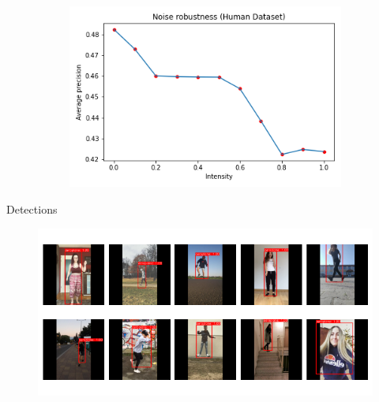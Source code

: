 \documentclass[en]{sdqbeamer}
\begin{document}
\begin{frame}
\begin{figure}
\begin{subfigure}{0.45\textwidth}
    \end{subfigure}
    \hfill
    \begin{subfigure}{0.45\textwidth}
      \centering
      \includegraphics[scale=0.35]{noise_robustness}
    \end{subfigure}
  \end{figure}
\end{frame}

\begin{frame}{Detections}
  \begin{figure}
    \centering
    \includegraphics[scale=0.5]{detections}
  \end{figure}
\end{frame}
\end{document}
